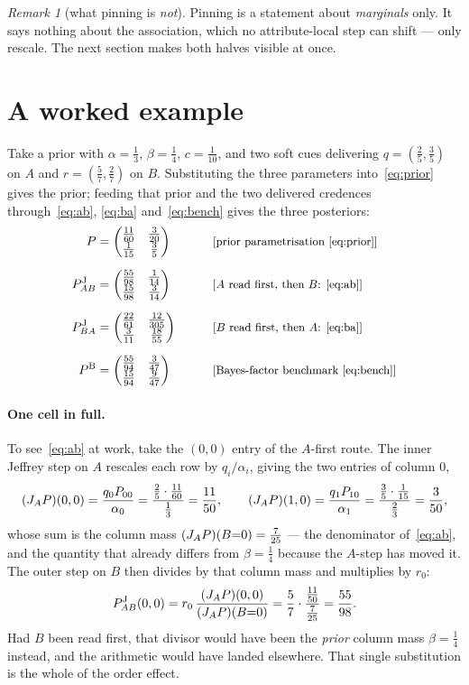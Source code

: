 \documentclass[11pt,a4paper]{article}
\newcommand{\PB}{P^{\mathrm{B}}}
\newcommand{\PJ}{P^{\mathrm{J}}}
\theoremstyle{definition}
\theoremstyle{plain}
\theoremstyle{remark}
\newtheorem{remark}{Remark}
\begin{document}
\begin{remark}[what pinning is \emph{not}]
Pinning is a statement about \emph{marginals} only. It says nothing about the
association, which no attribute-local step can shift --- only rescale. The
next section makes both halves visible at once.
\end{remark}

\section{A worked example}

Take a prior with $\alpha=\tfrac13$, $\beta=\tfrac14$, $c=\tfrac1{10}$, and two
soft cues delivering $q=(\tfrac25,\tfrac35)$ on $A$ and $r=(\tfrac57,\tfrac27)$
on $B$. Substituting the three parameters into~\eqref{eq:prior} gives the prior;
feeding that prior and the two delivered credences through~\eqref{eq:ab},
\eqref{eq:ba} and~\eqref{eq:bench} gives the three posteriors:
\begin{alignat*}{2}
  P &= \begin{pmatrix}\PriorCells\end{pmatrix}
    &&\qquad\text{\small [prior parametrisation \eqref{eq:prior}]}\\[6pt]
  \PJ_{AB} &= \begin{pmatrix}\AbCells\end{pmatrix}
    &&\qquad\text{\small [$A$ read first, then $B$: \eqref{eq:ab}]}\\[6pt]
  \PJ_{BA} &= \begin{pmatrix}\BaCells\end{pmatrix}
    &&\qquad\text{\small [$B$ read first, then $A$: \eqref{eq:ba}]}\\[6pt]
  \PB &= \begin{pmatrix}\BmCells\end{pmatrix}
    &&\qquad\text{\small [Bayes-factor benchmark \eqref{eq:bench}]}
\end{alignat*}

\paragraph{One cell in full.}
To see~\eqref{eq:ab} at work, take the $(0,0)$ entry of the $A$-first route. The
inner Jeffrey step on $A$ rescales each row by $q_{i}/\alpha_{i}$, giving the
two entries of column $0$,
\[
  (J_{A}P)(0,0)=\frac{q_{0}P_{00}}{\alpha_{0}}
    =\frac{\tfrac25\cdot\frac{11}{60}}{\tfrac13}=\frac{11}{50},
  \qquad
  (J_{A}P)(1,0)=\frac{q_{1}P_{10}}{\alpha_{1}}
    =\frac{\tfrac35\cdot\frac{1}{15}}{\tfrac23}=\frac{3}{50} ,
\]
whose sum is the column mass $(J_{A}P)(B{=}0)=\frac{7}{25}$ --- the denominator
of~\eqref{eq:ab}, and the quantity that already differs from $\beta=\tfrac14$
because the $A$-step has moved it. The outer step on $B$ then divides by that
column mass and multiplies by $r_{0}$:
\[
  \PJ_{AB}(0,0)
   = r_{0}\,\frac{(J_{A}P)(0,0)}{(J_{A}P)(B{=}0)}
   = \frac57\cdot\frac{\JAPzz}{\JAPcol}
   = \ABzz .
\]
Had $B$ been read first, that divisor would have been the \emph{prior} column
mass $\beta=\tfrac14$ instead, and the arithmetic would have landed elsewhere.
That single substitution is the whole of the order effect.
\end{document}

